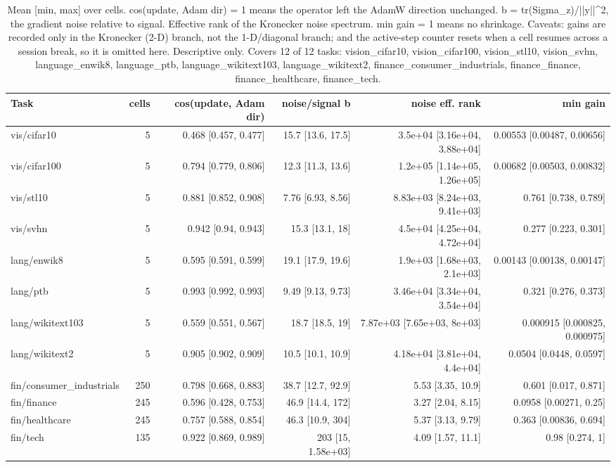 \begin{table}[t]
\centering
\small
\caption{Mean [min, max] over cells. cos(update, Adam dir) = 1 means the operator left the AdamW direction unchanged. b = tr(Sigma\_z)/||y||^2, the gradient noise relative to signal. Effective rank of the Kronecker noise spectrum. min gain = 1 means no shrinkage. Caveats: gains are recorded only in the Kronecker (2-D) branch, not the 1-D/diagonal branch; and the active-step counter resets when a cell resumes across a session break, so it is omitted here. Descriptive only. Covers 12 of 12 tasks: vision\_cifar10, vision\_cifar100, vision\_stl10, vision\_svhn, language\_enwik8, language\_ptb, language\_wikitext103, language\_wikitext2, finance\_consumer\_industrials, finance\_finance, finance\_healthcare, finance\_tech.}
\label{tab:table10_evie_telemetry}
\begin{tabular}{lrrrrr}
\toprule
Task & cells & cos(update, Adam dir) & noise/signal b & noise eff. rank & min gain \\
\midrule
vis/cifar10 & 5 & 0.468 [0.457, 0.477] & 15.7 [13.6, 17.5] & 3.5e+04 [3.16e+04, 3.88e+04] & 0.00553 [0.00487, 0.00656] \\
vis/cifar100 & 5 & 0.794 [0.779, 0.806] & 12.3 [11.3, 13.6] & 1.2e+05 [1.14e+05, 1.26e+05] & 0.00682 [0.00503, 0.00832] \\
vis/stl10 & 5 & 0.881 [0.852, 0.908] & 7.76 [6.93, 8.56] & 8.83e+03 [8.24e+03, 9.41e+03] & 0.761 [0.738, 0.789] \\
vis/svhn & 5 & 0.942 [0.94, 0.943] & 15.3 [13.1, 18] & 4.5e+04 [4.25e+04, 4.72e+04] & 0.277 [0.223, 0.301] \\
lang/enwik8 & 5 & 0.595 [0.591, 0.599] & 19.1 [17.9, 19.6] & 1.9e+03 [1.68e+03, 2.1e+03] & 0.00143 [0.00138, 0.00147] \\
lang/ptb & 5 & 0.993 [0.992, 0.993] & 9.49 [9.13, 9.73] & 3.46e+04 [3.34e+04, 3.54e+04] & 0.321 [0.276, 0.373] \\
lang/wikitext103 & 5 & 0.559 [0.551, 0.567] & 18.7 [18.5, 19] & 7.87e+03 [7.65e+03, 8e+03] & 0.000915 [0.000825, 0.000975] \\
lang/wikitext2 & 5 & 0.905 [0.902, 0.909] & 10.5 [10.1, 10.9] & 4.18e+04 [3.81e+04, 4.4e+04] & 0.0504 [0.0448, 0.0597] \\
fin/consumer\_industrials & 250 & 0.798 [0.668, 0.883] & 38.7 [12.7, 92.9] & 5.53 [3.35, 10.9] & 0.601 [0.017, 0.871] \\
fin/finance & 245 & 0.596 [0.428, 0.753] & 46.9 [14.4, 172] & 3.27 [2.04, 8.15] & 0.0958 [0.00271, 0.25] \\
fin/healthcare & 245 & 0.757 [0.588, 0.854] & 46.3 [10.9, 304] & 5.37 [3.13, 9.79] & 0.363 [0.00836, 0.694] \\
fin/tech & 135 & 0.922 [0.869, 0.989] & 203 [15, 1.58e+03] & 4.09 [1.57, 11.1] & 0.98 [0.274, 1] \\
\bottomrule
\end{tabular}
\end{table}
